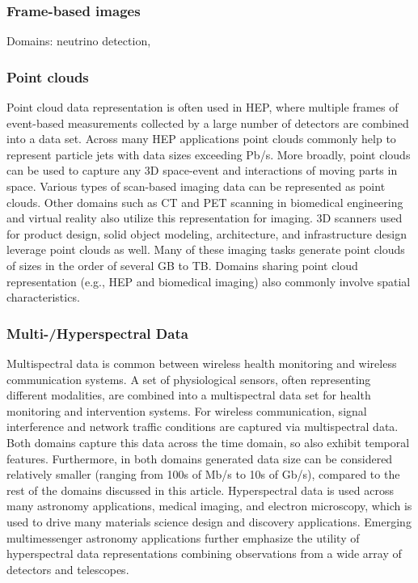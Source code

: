 \subsubsection{Frame-based images}
Domains: neutrino detection, 
\subsubsection{Point clouds}
 Point cloud data representation is often used in HEP, where multiple frames of event-based measurements collected by a large number of detectors are combined into a data set. Across many HEP applications point clouds commonly help to represent particle jets with data sizes exceeding Pb/s. More broadly, point clouds can be used to capture any 3D space-event and interactions of moving parts in space. Various types of scan-based imaging data can be represented as point clouds. Other domains such as CT and PET scanning in biomedical engineering and virtual reality also utilize this representation for imaging. 3D scanners used for product design, solid object modeling, architecture, and infrastructure design leverage point clouds as well. Many of these imaging tasks generate point clouds of sizes in the order of several GB to TB. Domains sharing point cloud representation (e.g., HEP and biomedical imaging) also commonly involve spatial characteristics. 
 \subsubsection{Multi-/Hyperspectral Data}
 Multispectral data is common between wireless health monitoring and wireless communication systems. A set of physiological sensors, often representing different modalities, are combined into a multispectral data set for health monitoring and intervention systems. For wireless communication, signal interference and network traffic conditions are captured via multispectral data. Both domains capture this data across the time domain, so also exhibit temporal features. Furthermore, in both domains generated data size can be considered relatively smaller (ranging from 100s of Mb/s to 10s of Gb/s), compared to the rest of the domains discussed in this article. Hyperspectral data is used across many astronomy applications, medical imaging, and electron microscopy, which is used to drive many materials science design and discovery applications. Emerging multimessenger astronomy applications further emphasize the utility of hyperspectral data representations combining observations from a wide array of detectors and telescopes. 

